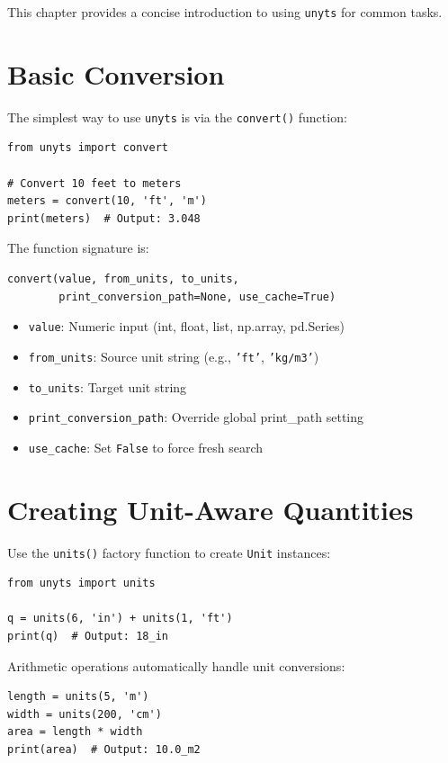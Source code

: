 \documentclass[11pt,a4paper]{report}
\begin{document}
This chapter provides a concise introduction to using \texttt{unyts} for common tasks.

\section{Basic Conversion}

The simplest way to use \texttt{unyts} is via the \texttt{convert()} function:

\begin{lstlisting}[style=pythonstyle]
from unyts import convert

# Convert 10 feet to meters
meters = convert(10, 'ft', 'm')
print(meters)  # Output: 3.048
\end{lstlisting}

The function signature is:
\begin{lstlisting}[style=pythonstyle]
convert(value, from_units, to_units, 
        print_conversion_path=None, use_cache=True)
\end{lstlisting}

\begin{itemize}[leftmargin=*]
  \item \texttt{value}: Numeric input (int, float, list, np.array, pd.Series)
  \item \texttt{from\_units}: Source unit string (e.g., \texttt{'ft'}, \texttt{'kg/m3'})
  \item \texttt{to\_units}: Target unit string
  \item \texttt{print\_conversion\_path}: Override global print\_path setting
  \item \texttt{use\_cache}: Set \texttt{False} to force fresh search
\end{itemize}

\section{Creating Unit-Aware Quantities}

Use the \texttt{units()} factory function to create \texttt{Unit} instances:

\begin{lstlisting}[style=pythonstyle]
from unyts import units

q = units(6, 'in') + units(1, 'ft')
print(q)  # Output: 18_in
\end{lstlisting}

Arithmetic operations automatically handle unit conversions:

\begin{lstlisting}[style=pythonstyle]
length = units(5, 'm')
width = units(200, 'cm')
area = length * width
print(area)  # Output: 10.0_m2
\end{lstlisting}
\end{document}

